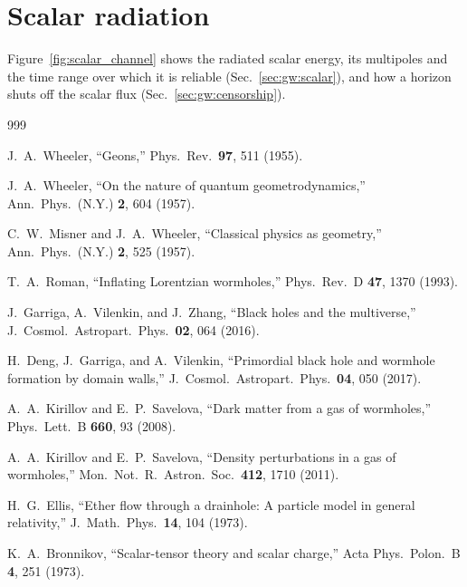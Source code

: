 \documentclass[twocolumn,floatfix,aps,prd,superscriptaddress,nofootinbib,showkeys]{revtex4-2}
\begin{document}
\section{Scalar radiation}
\label{app:supp}

Figure~\ref{fig:scalar_channel} shows the radiated scalar energy, its multipoles and the time range over which it is reliable (Sec.~\ref{sec:gw:scalar}), and how a horizon shuts off the scalar flux (Sec.~\ref{sec:gw:censorship}).

\FloatBarrier

\begin{thebibliography}{999}

J.~A.~Wheeler,
\newblock ``Geons,''
\newblock Phys.\ Rev.\ \textbf{97}, 511 (1955).

J.~A.~Wheeler,
\newblock ``On the nature of quantum geometrodynamics,''
\newblock Ann.\ Phys.\ (N.Y.) \textbf{2}, 604 (1957).

C.~W.~Misner and J.~A.~Wheeler,
\newblock ``Classical physics as geometry,''
\newblock Ann.\ Phys.\ (N.Y.) \textbf{2}, 525 (1957).

T.~A.~Roman,
\newblock ``Inflating Lorentzian wormholes,''
\newblock Phys.\ Rev.\ D \textbf{47}, 1370 (1993).

J.~Garriga, A.~Vilenkin, and J.~Zhang,
\newblock ``Black holes and the multiverse,''
\newblock J.\ Cosmol.\ Astropart.\ Phys.\ \textbf{02}, 064 (2016).

H.~Deng, J.~Garriga, and A.~Vilenkin,
\newblock ``Primordial black hole and wormhole formation by domain walls,''
\newblock J.\ Cosmol.\ Astropart.\ Phys.\ \textbf{04}, 050 (2017).

A.~A.~Kirillov and E.~P.~Savelova,
\newblock ``Dark matter from a gas of wormholes,''
\newblock Phys.\ Lett.\ B \textbf{660}, 93 (2008).

A.~A.~Kirillov and E.~P.~Savelova,
\newblock ``Density perturbations in a gas of wormholes,''
\newblock Mon.\ Not.\ R.\ Astron.\ Soc.\ \textbf{412}, 1710 (2011).

H.~G.~Ellis,
\newblock ``Ether flow through a drainhole: A particle model in general relativity,''
\newblock J.\ Math.\ Phys.\ \textbf{14}, 104 (1973).

K.~A.~Bronnikov,
\newblock ``Scalar-tensor theory and scalar charge,''
\newblock Acta Phys.\ Polon.\ B \textbf{4}, 251 (1973).


\end{thebibliography}
\end{document}
